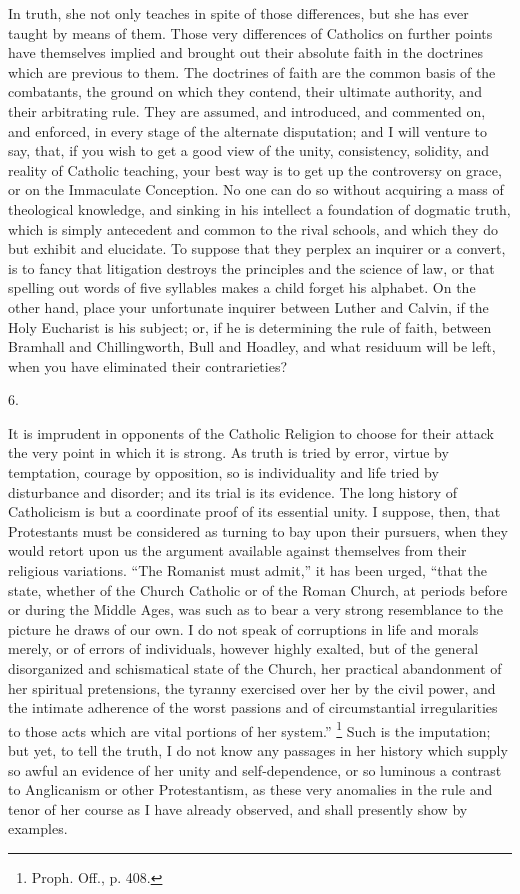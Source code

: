 In truth, she not only teaches in spite of those differences, but
she has ever taught by means of them. Those very differences of
Catholics on further points have themselves implied and brought out
their absolute faith in the doctrines which are previous to them. The
doctrines of faith are the common basis of the combatants, the ground
on which they contend, their ultimate authority, and their arbitrating
rule. They are assumed, and introduced, and commented on, and
enforced, in every stage of the alternate disputation; and I will
venture to say, that, if you wish to get a good view of the unity,
consistency, solidity, and reality of Catholic teaching, your best way
is to get up the controversy on grace, or on the Immaculate
Conception. No one can do so without acquiring a mass of theological
knowledge, and sinking in his intellect a foundation of dogmatic
truth, which is simply antecedent and common to the rival schools, and
which they do but exhibit and elucidate. To suppose that they perplex
an inquirer or a convert, is to fancy that litigation destroys the
principles and the science of law, or that spelling out words of five
syllables makes a child forget his alphabet. On the other hand, place
your unfortunate inquirer between Luther and Calvin, if the Holy
Eucharist is his subject; or, if he is determining the rule of faith,
between Bramhall and Chillingworth, Bull and Hoadley, and what
residuum will be left, when you have eliminated their contrarieties?

6.

It is imprudent in opponents of the Catholic Religion to choose for
their attack the very point in which it is strong. As truth is tried
by error, virtue by temptation, courage by opposition, so is
individuality and life tried by disturbance and disorder; and its
trial is its evidence. The long history of Catholicism is but a
coordinate proof of its essential unity. I suppose, then, that
Protestants must be considered as turning to bay upon their pursuers,
when they would retort upon us the argument available against
themselves from their religious variations. ``The Romanist must
admit,'' it has been urged, ``that the state, whether of the
Church Catholic or of the Roman Church, at periods before or during
the Middle Ages, was such as to bear a very strong resemblance to the
picture he draws of our own. I do not speak of corruptions in life and
morals merely, or of errors of individuals, however highly exalted,
but of the general disorganized and schismatical state of the Church,
her practical abandonment of her spiritual pretensions, the tyranny
exercised over her by the civil power, and the intimate adherence of
the worst passions and of circumstantial irregularities to those acts
which are vital portions of her system.'' \footnote{Proph. Off., p. 408.} Such is the imputation; but yet, to tell the truth, I do not
know any passages in her history which supply so awful an evidence of
her unity and self-dependence, or so luminous a contrast to
Anglicanism or other Protestantism, as these very anomalies in the
rule and tenor of her course as I have already observed, and shall
presently show by examples.

